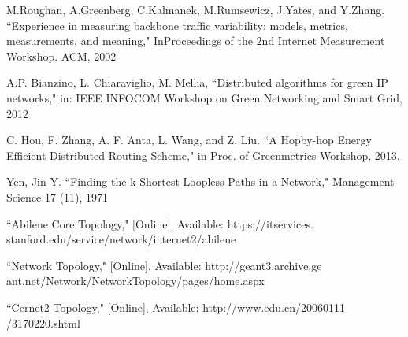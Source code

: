 \documentclass[conference]{IEEEtran}
\begin{document}
\begin{thebibliography}{1}
M.Roughan, A.Greenberg, C.Kalmanek, M.Rumsewicz, J.Yates, and Y.Zhang. ``Experience in measuring backbone traffic variability: models, metrics, measurements, and meaning," InProceedings of the 2nd Internet Measurement Workshop. ACM, 2002

A.P. Bianzino, L. Chiaraviglio, M. Mellia, ``Distributed algorithms for green IP networks," in: IEEE INFOCOM Workshop on Green Networking and Smart Grid, 2012

C. Hou, F. Zhang, A. F. Anta, L. Wang, and Z. Liu. ``A Hopby-hop Energy Efficient Distributed Routing Scheme," in Proc. of Greenmetrics Workshop, 2013.

Yen, Jin Y. ``Finding the k Shortest Loopless Paths in a Network," Management Science 17 (11), 1971

``Abilene Core Topology," [Online], Available: https://itservices.
stanford.edu/service/network/internet2/abilene

``Network Topology," [Online], Available: http://geant3.archive.ge
ant.net/Network/NetworkTopology/pages/home.aspx

``Cernet2 Topology," [Online], Available: http://www.edu.cn/20060111
/3170220.shtml

\end{thebibliography}

\appendices
\end{document}
